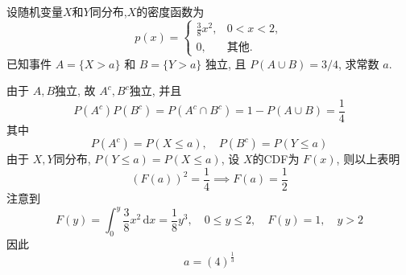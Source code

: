 \documentclass[../main.tex]{subfiles}
\begin{document}
\begin{exercise}{}{}
设随机变量$X$和$Y$同分布,$X$的密度函数为
\[ p(x) = \begin{cases} \frac{3}{8}x^2, & 0 < x < 2, \\ 0, & \text{其他}. \end{cases} \]
已知事件 $A = \{X>a\}$ 和 $B=\{Y>a\}$ 独立, 且 $P(A \cup B) = 3/4$, 求常数 $a$.
\end{exercise}
\begin{solution}
     由于 \(  A,B  \)独立, 故 \(  A^{c},B^{c}  \)独立, 并且  \[
   P\left( A^{c} \right)P\left( B^{c} \right)    = P\left( A^{c}\cap B^{c} \right)= 1-P\left( A\cup B \right)= \frac{1 }{4 }   
     \]其中 \[
     P\left( A^{c} \right)= P\left( X\le a \right),\quad P\left( B^{c} \right)= P\left( Y\le a \right)    
     \]由于 \(  X,Y  \)同分布,  \(  P\left( Y\le a \right)= P\left( X\le a \right)    \), 设 \(  X  \)的CDF为 \(  F\left( x \right)   \), 则以上表明 \[
     \left( F\left( a \right) \right)^{2} = \frac{1 }{4 } \implies F\left( a \right)= \frac{1 }{2 }   
     \]   注意到 \[
    F\left( y \right)=   \int_{0}^{y}\frac{3 }{8 }x^{2}\,\mathrm{d} x= \frac{1 }{8 }y^{3},\quad 0\le y\le 2,\quad F\left( y \right)=  1 ,\quad y> 2
     \]因此  \[
     a= \left( 4 \right)^{\frac{1 }{3 } } 
     \]
\end{solution}
\end{document}
